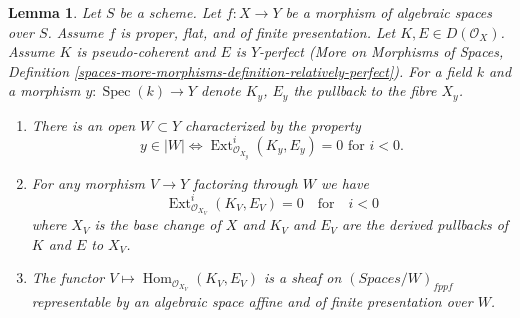 \documentclass[10pt,a4paper]{amsart}
\theoremstyle{plain}
\newtheorem{lemma}[subsection]{Lemma}
\theoremstyle{definition}
\theoremstyle{remark}
\numberwithin{equation}{subsection}
\def\Spec{\mathop{\mathrm{Spec}}}
\def\Hom{\mathop{\mathrm{Hom}}\nolimits}
\def\Ext{\mathop{\mathrm{Ext}}\nolimits}
\begin{document}
\begin{lemma}
\label{lemma-complexes-open-neg-exts-vanishing}
Let $S$ be a scheme.
Let $f : X \to Y$ be a morphism of algebraic spaces over $S$.
Assume $f$ is proper, flat, and of finite presentation.
Let $K, E \in D(\mathcal{O}_X)$. Assume $K$ is pseudo-coherent
and $E$ is $Y$-perfect (More on Morphisms of Spaces, Definition
\ref{spaces-more-morphisms-definition-relatively-perfect}).
For a field $k$ and a morphism $y : \Spec(k) \to Y$ denote $K_y$, $E_y$
the pullback to the fibre $X_y$.
\begin{enumerate}
\item There is an open $W \subset Y$ characterized by the property
$$
y \in |W|
\Leftrightarrow
\Ext^i_{\mathcal{O}_{X_y}}(K_y, E_y) = 0
\text{ for }i < 0.
$$
\item For any morphism $V \to Y$ factoring through $W$ we have
$$
\Ext^i_{\mathcal{O}_{X_V}}(K_V, E_V) = 0
\quad\text{for}\quad i < 0
$$
where $X_V$ is the base change of $X$ and $K_V$ and $E_V$
are the derived pullbacks of $K$ and $E$ to $X_V$.
\item The functor $V \mapsto \Hom_{\mathcal{O}_{X_V}}(K_V, E_V)$
is a sheaf on $(\textit{Spaces}/W)_{fppf}$ representable by an
algebraic space affine and of finite presentation over $W$.
\end{enumerate}
\end{lemma}
\end{document}
